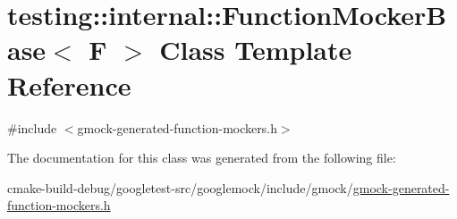 \hypertarget{classtesting_1_1internal_1_1FunctionMockerBase}{}\section{testing\+::internal\+::Function\+Mocker\+Base$<$ F $>$ Class Template Reference}
\label{classtesting_1_1internal_1_1FunctionMockerBase}


{\ttfamily \#include $<$gmock-\/generated-\/function-\/mockers.\+h$>$}



The documentation for this class was generated from the following file\+:\begin{DoxyCompactItemize}
\item 
cmake-\/build-\/debug/googletest-\/src/googlemock/include/gmock/\mbox{\hyperlink{gmock-generated-function-mockers_8h}{gmock-\/generated-\/function-\/mockers.\+h}}\end{DoxyCompactItemize}
